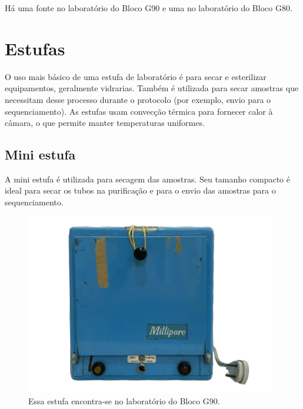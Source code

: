 \documentclass[
  letterpaper,
  DIV=11,
  numbers=noendperiod]{scrreprt}
\begin{document}
\begin{figure}
\begin{minipage}[t]{0.50\linewidth}
{{}

}

\end{minipage}%

\end{figure}

Há uma fonte no laboratório do Bloco G90 e uma no laboratório do Bloco
G80.

\hypertarget{estufas}{%
\section{Estufas}\label{estufas}}

O uso mais básico de uma estufa de laboratório é para secar e
esterilizar equipamentos, geralmente vidrarias. Também é utilizada para
secar amostras que necessitam desse processo durante o protocolo (por
exemplo, envio para o sequenciamento). As estufas usam convecção térmica
para fornecer calor à câmara, o que permite manter temperaturas
uniformes.

\hypertarget{mini-estufa}{%
\subsection{Mini estufa}\label{mini-estufa}}

A mini estufa é utilizada para secagem das amostras. Seu tamanho
compacto é ideal para secar os tubos na purificação e para o envio das
amostras para o sequenciamento.

\begin{figure}

{\centering \includegraphics[width=\textwidth,height=3.125in]{figures/equipamentos/estufa_pequena.png}

}

\caption{Essa estufa encontra-se no laboratório do Bloco G90.}

\end{figure}
\end{document}
